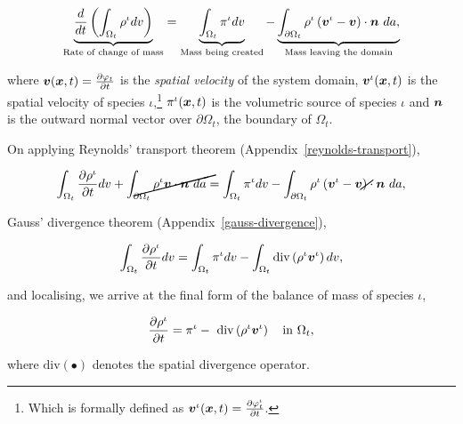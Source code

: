 \begin{equation}
\underbrace{\frac{d}{dt}\left(\int_{\Omega_{t}} \rho^{\iota} dv
  \right)}_{\text{Rate of change of mass}} = 
 \underbrace{\int_{\Omega_{t}}
  \pi^{\iota} dv}_{\text{Mass being created}}
- \underbrace{\int_{\partial \Omega_{t}} \rho^{\iota}
  \left(\bv^{\iota} - \bv\right) \cdot \bn\ 
da,}_{\text{Mass leaving the domain}}
\label{globalbalanceofmass}
\end{equation}

 where $\mbox{\boldmath$ v$}(\mbox{\boldmath$ x$},t) = \frac{\partial \varphi_{t}}{\partial t}$
is the {\em spatial velocity} of the system domain,
$\mbox{\boldmath$ v$}^{\iota}(\mbox{\boldmath$ x$},t)$ is the spatial velocity of species
$\iota$,\footnote{Which is formally defined as $\mbox{\boldmath$ v$}^{\iota}(\mbox{\boldmath$ x$},t) =
  \frac{\partial \varphi^{\iota}_{t}}{\partial t}$.} %
 $\pi^{\iota}(\mbox{\boldmath$ x$},t)$ is the volumetric source of species $\iota$ and
$\mbox{\boldmath$ n$}$ is the outward normal vector over $\partial \Omega_{t}$, the
boundary of $\Omega_{t}$.

On applying Reynolds' transport theorem (Appendix~\ref{reynolds-transport}),

\begin{equation*}
\int_{\Omega_{t}} \frac{\partial \rho^{\iota}}{\partial t} dv
+ \cancel{\int_{\partial \Omega_{t}} \rho^{\iota} \bv \cdot \bn\ da} =
\int_{\Omega_{t}} \pi^{\iota} dv
- \int_{\partial \Omega_{t}} \rho^{\iota} \left(\bv^{\iota} -
\cancel{\bv}\right) \cdot \bn\ da,
\end{equation*}

Gauss' divergence theorem (Appendix~\ref{gauss-divergence}),

\begin{equation*}
\int_{\Omega_{t}} \frac{\partial \rho^{\iota}}{\partial t} dv =
\int_{\Omega_{t}} \pi^{\iota} dv
- \int_{\Omega_{t}} \mathrm{div} \left( \rho^{\iota} \mbox{\boldmath$ v$}^{\iota}\right) dv, 
\end{equation*}

and localising, we arrive at the final form of the balance of
mass of species $\iota$,

\begin{equation}
\frac{\partial \rho^{\iota}}{\partial t}  =
\pi^{\iota}
-\ \mathrm{div} \left(\rho^{\iota} \mbox{\boldmath$ v$}^{\iota}\right)
\quad \mathrm{in}\ \Omega_{t},
\label{localbalanceofmass}
\end{equation}

where $\mathrm{div} (\bullet)$ denotes the spatial divergence
operator. %

